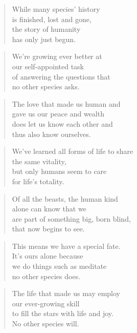 \documentclass[10pt,a4paper]{article}
\begin{document}
\begin{multicols}{2}
\begin{verse}
While many species’ history\\
is finished, lost and gone,\\
the story of humanity\\
has only just begun.
\end{verse}

\begin{verse}
We’re growing ever better at\\
our self-appointed task\\
of answering the questions that\\
no other species asks.
\end{verse}

\begin{verse}
The love that made us human and\\
gave us our peace and wealth\\
does let us know each other and\\
thus also know ourselves.
\end{verse}

\begin{verse}
We’ve learned all forms of life to share\\
the same vitality,\\
but only humans seem to care\\
for life’s totality.
\end{verse}

\begin{verse}
Of all the beasts, the human kind\\
alone can know that we\\
are part of something big, born blind,\\
that now begins to see.
\end{verse}

\begin{verse}
This means we have a special fate.\\
It’s ours alone because\\
we do things such as meditate\\
no other species does.
\end{verse}

\begin{verse}
The life that made us may employ\\
our ever-growing skill\\
to fill the stars with life and joy.\\
No other species will.
\end{verse}


\end{multicols}
\end{document}
